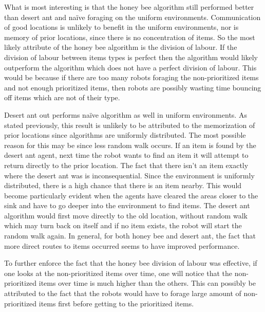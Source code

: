 What is most interesting is that the honey bee algorithm still performed better than desert ant and na\"ive foraging on the uniform environments. Communication of good locations is unlikely to benefit in the uniform environments, nor is memory of prior locations, since there is no concentration of items. So the most likely attribute of the honey bee algorithm is the division of labour. If the division of labour between items types is perfect then the algorithm would likely outperform the algorithm which does not have a perfect division of labour. This would be because if there are too many robots foraging the non-prioritized items and not enough prioritized items, then robots are possibly wasting time bouncing off items which are not of their type. %

Desert ant out performs na\"ive algorithm as well in uniform environments. As stated previously, this result is unlikely to be attributed to the memorization of prior locations since algorithms are uniformly distributed. The most possible reason for this may be since less random walk occurs. If an item is found by the desert ant agent, next time the robot wants to find an item it will attempt to return directly to the prior location. The fact that there isn't an item exactly where the desert ant was is inconsequential. Since the environment is uniformly distributed, there is a high chance that there is an item nearby. This would become particularly evident when the agents have cleared the areas closer to the sink and have to go deeper into the environment to find items. The desert ant algorithm would first move directly to the old location, without random walk which may turn back on itself and if no item exists, the robot will start the random walk again. In general, for both honey bee and desert ant, the fact that more direct routes to items occurred seems to have improved performance. 

To further enforce the fact that the honey bee division of labour was effective, if one looks at the non-prioritized items over time, one will notice that the non-prioritized items over time is much higher than the others. This can possibly be attributed to the fact that the robots would have to forage large amount of non-prioritized items first before getting to the prioritized items.

